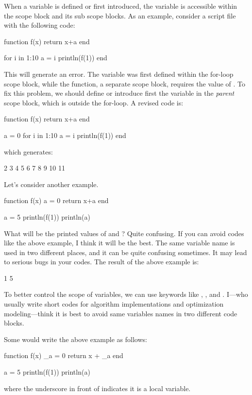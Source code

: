 When a variable is defined or first introduced, the variable is accessible within the scope block and its sub scope blocks. As an example, consider a script file with the following code:
\begin{code}
function f(x)
    return x+a
end

for i in 1:10
    a = i
    println(f(1))
end
\end{code}
\noindent This will generate an error. The  variable was first defined within the for-loop scope block, while the function, a separate scope block, requires the value of . To fix this problem, we should define or introduce first the  variable in the \emph{parent} scope block, which is outside the for-loop. A revised code is:
\begin{code}
function f(x)
    return x+a
end

a = 0
for i in 1:10
    a = i
    println(f(1))
end
\end{code}
\noindent which generates:
\begin{code}
2
3
4
5
6
7
8
9
10
11
\end{code}

Let's consider another example.
\begin{code}
function f(x)
    a = 0
    return x+a
end

a = 5
println(f(1))
println(a)
\end{code}
\noindent What will be the printed values of  and ? Quite confusing. If you can avoid codes like the above example, I think it will be the best. The same  variable name is used in two different places, and it can be quite confusing sometimes. It may lead to serious bugs in your codes. The result of the above example is:
\begin{code}
1
5
\end{code}

To better control the scope of variables, we can use keywords like , , and . I---who usually write short codes for algorithm implementations and optimization modeling---think it is best to avoid same variables names in two different code blocks.

Some would write the above example as follows:
\begin{code}
function f(x)
    _a = 0
    return x + _a
end

a = 5
println(f(1))
println(a)
\end{code}
\noindent where the underscore in front of  indicates it is a local variable.

